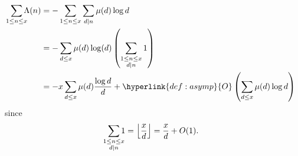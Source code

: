 \documentclass{article}
\DeclarePairedDelimiter\floor{\lfloor}{\rfloor}
\begin{document}
\begin{eg}
  \begin{align*}
    \sum_{\mathclap{1\leq n \leq x}}\Lambda(n) &= -\sum_{1\leq n\leq x}\sum_{d|n}\mu(d)\log d \\
                                    &= - \sum_{d\leq x}\mu(d)\log(d)\left(\sum_{\substack{1\leq n\leq x \\ d|n}}1\right) \\
                                    &= - x \sum_{d\leq x}\mu(d) \frac{\log d}{d} + \hyperlink{def:asymp}{O}\left(\sum_{d\leq x}\mu(d)\log d \right)
  \end{align*}
  since
  \begin{equation*}
    \sum_{\mathclap{\substack{1\leq n\leq x \\ d|n}}}1 = \floor*{\frac{x}{d}}= \frac{x}{d} + O(1).
  \end{equation*}
\end{eg}
\clearpage
\printnomenclature
\printindex
\end{document}
